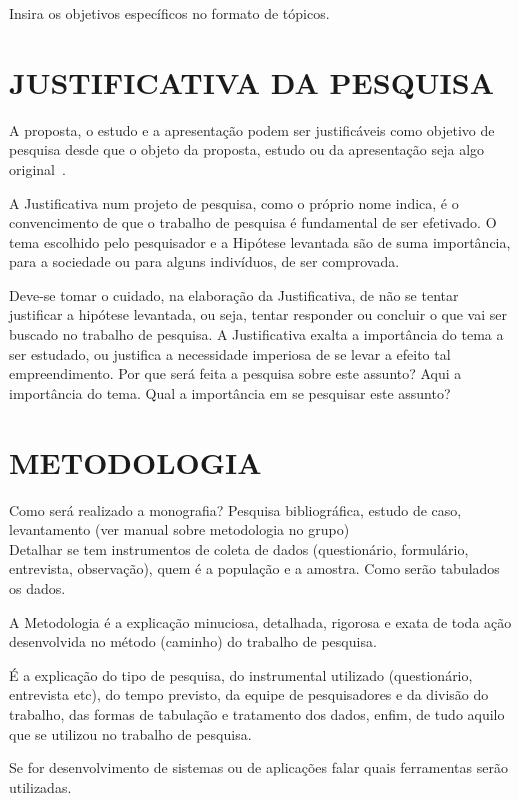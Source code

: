 \documentclass[
    12pt,				       %
    openright,			       %
    oneside,			       %
    a4paper,			       %
    chapter=TITLE,             %
    sumario=tradicional,       %
    english,			        %
    brazil, 				    %
 ]{abntex2}
\begin{document}
Insira os objetivos específicos no formato de tópicos.

\section{\MakeUppercase{Justificativa da Pesquisa}}\label{sec:Justificativa}
A proposta, o estudo e a apresentação podem ser justificáveis como objetivo de pesquisa desde que o objeto da proposta, estudo ou da apresentação seja algo original~\cite{wazlawick2009}.

A Justificativa num projeto de pesquisa, como o próprio nome indica, é o convencimento de que o trabalho de pesquisa é fundamental de ser efetivado. O tema escolhido pelo pesquisador e a Hipótese levantada são de suma importância, para a sociedade ou para alguns indivíduos, de ser comprovada.

Deve-se tomar o cuidado, na elaboração da Justificativa, de não se tentar justificar a hipótese levantada, ou seja, tentar responder ou concluir o que vai ser buscado no trabalho de pesquisa. A Justificativa exalta a importância do tema a ser estudado, ou justifica a necessidade imperiosa de se levar a efeito tal empreendimento.
Por que será feita a pesquisa sobre este assunto? Aqui a importância do tema. Qual a importância em se pesquisar este assunto?


\section{\MakeUppercase{Metodologia}}\label{sec:Metodologia}
Como será realizado a monografia? Pesquisa bibliográfica, estudo de caso, levantamento (ver manual sobre metodologia no grupo) \\
Detalhar se tem instrumentos de coleta de dados (questionário, formulário, entrevista, observação), quem é a população e a amostra. Como serão tabulados os dados.

A Metodologia é a explicação minuciosa, detalhada, rigorosa e exata de toda ação desenvolvida no método (caminho) do trabalho de pesquisa.

É a explicação do tipo de pesquisa, do instrumental utilizado (questionário, entrevista etc), do tempo previsto, da equipe de pesquisadores e da divisão do trabalho, das formas de tabulação e tratamento dos dados, enfim, de tudo aquilo que se utilizou no trabalho de pesquisa.

Se for desenvolvimento de sistemas ou de aplicações falar quais ferramentas serão utilizadas.
\end{document}

